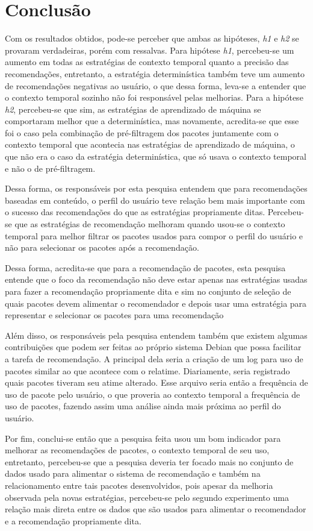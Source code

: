 \chapter[Conclusão]{Conclusão}

Com os resultados obtidos, pode-se perceber que ambas as hipóteses, \textit{h1}
e \textit{h2} se provaram verdadeiras, porém com ressalvas. Para hipótese
\textit{h1}, percebeu-se um aumento em todas as estratégias de contexto
temporal quanto a precisão das recomendações, entretanto, a estratégia
determinística também teve um aumento de recomendações negativas ao usuário, o
que dessa forma, leva-se a entender que o contexto temporal sozinho não foi
responsável pelas melhorias. Para a hipótese \textit{h2}, percebeu-se que sim,
as estratégias de aprendizado de máquina se comportaram melhor que a
determinística, mas novamente, acredita-se que esse foi o caso pela combinação
de pré-filtragem dos pacotes juntamente com o contexto temporal que acontecia
nas estratégias de aprendizado de máquina, o que não era o caso da estratégia
determinística, que só usava o contexto temporal e não o de pré-filtragem.

Dessa forma, os responsáveis por esta pesquisa entendem que para recomendações
baseadas em conteúdo, o perfil do usuário teve relação bem mais importante com o
sucesso das recomendações do que as estratégias propriamente ditas. Percebeu-se
que as estratégias de recomendação melhoram quando usou-se o contexto temporal
para melhor filtrar os pacotes usados para compor o perfil do usuário e não para
selecionar os pacotes após a recomendação.

Dessa forma, acredita-se que para a recomendação de pacotes, esta pesquisa
entende que o foco da recomendação não deve estar apenas nas estratégias usadas
para fazer a recomendação propriamente dita e sim no conjunto de seleção de
quais pacotes devem alimentar o recomendador e depois usar uma estratégia
para representar e selecionar os pacotes para uma recomendação

Além disso, os responsáveis pela pesquisa entendem também que existem algumas
contribuições que podem ser feitas ao próprio sistema Debian que possa facilitar
a tarefa de recomendação. A principal dela seria a criação de um log para uso de
pacotes similar ao que acontece com o relatime. Diariamente, seria registrado
quais pacotes tiveram seu atime alterado. Esse arquivo seria então a frequência
de uso de pacote pelo usuário, o que proveria ao contexto temporal a frequência
de uso de pacotes, fazendo assim uma análise ainda mais próxima ao perfil do
usuário.

Por fim, conclui-se então que a pesquisa feita usou um bom indicador para melhorar as
recomendações de pacotes, o contexto temporal de seu uso, entretanto,
percebeu-se que a pesquisa deveria ter focado mais no conjunto de dados usado
para alimentar o sistema de recomendação e também na relacionamento entre tais
pacotes desenvolvidos, pois apesar da melhoria observada pela novas estratégias,
percebeu-se pelo segundo experimento uma relação mais direta entre os dados que
são usados para alimentar o recomendador e a recomendação propriamente dita.
